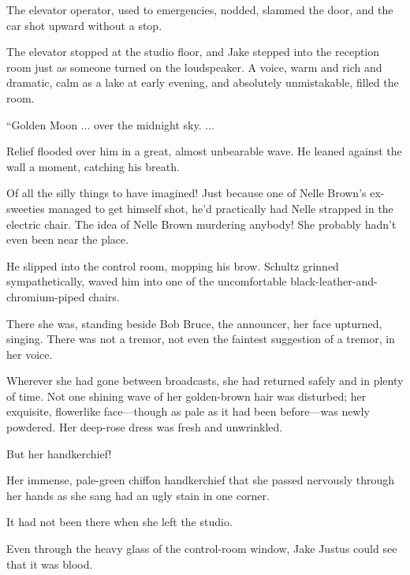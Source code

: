 \documentclass{novel}
\begin{document}
The elevator operator, used to emergencies, nodded, slammed the door, and the car shot upward without a stop.

The elevator stopped at the studio floor, and Jake stepped into the reception room just as someone turned on the loudspeaker. A voice, warm and rich and dramatic, calm as a lake at early evening, and absolutely unmistakable, filled the room.

“Golden Moon ... over the midnight sky. ...

Relief flooded over him in a great, almost unbearable wave. He leaned against the wall a moment, catching his breath.

Of all the silly things to have imagined! Just because one of Nelle Brown’s ex-sweeties managed to get himself shot, he’d practically had Nelle strapped in the electric chair. The idea of Nelle Brown murdering anybody! She probably hadn’t even been near the place.

He slipped into the control room, mopping his brow. Schultz grinned sympathetically, waved him into one of the uncomfortable black-leather-and-chromium-piped chairs.

There she was, standing beside Bob Bruce, the announcer, her face upturned, singing. There was not a tremor, not even the faintest suggestion of a tremor, in her voice.

Wherever she had gone between broadcasts, she had returned safely and in plenty of time. Not one shining wave of her golden-brown hair was disturbed; her exquisite, flowerlike face—though as pale as it had been before—was newly powdered. Her deep-rose dress was fresh and unwrinkled.

But her handkerchief!

Her immense, pale-green chiffon handkerchief that she passed nervously through her hands as she sang had an ugly stain in one corner.

It had not been there when she left the studio.

Even through the heavy glass of the control-room window, Jake Justus could see that it was blood.

\begin{ChapterStart}
\vspace{3\nbs}
\end{ChapterStart}
\end{document}
